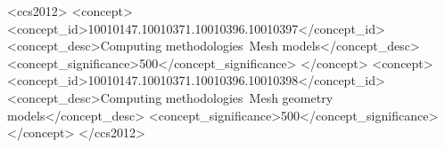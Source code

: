 \documentclass[acmtog,anonymous,review]{acmart}
\begin{document}
%
%
\begin{CCSXML}
<ccs2012>
<concept>
<concept_id>10010147.10010371.10010396.10010397</concept_id>
<concept_desc>Computing methodologies~Mesh models</concept_desc>
<concept_significance>500</concept_significance>
</concept>
<concept>
<concept_id>10010147.10010371.10010396.10010398</concept_id>
<concept_desc>Computing methodologies~Mesh geometry models</concept_desc>
<concept_significance>500</concept_significance>
</concept>
</ccs2012>
\end{CCSXML}


%
%





\maketitle












\appendix
\end{document}
